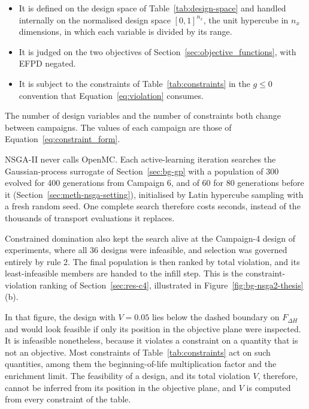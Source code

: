 \begin{itemize}
  \item It is defined on the design space of Table~\ref{tab:design-space}
        and handled internally on the normalised design space
        $[0,1]^{n_x}$, the unit hypercube in $n_x$ dimensions, in which
        each variable is divided by its range.

  \item It is judged on the two objectives of
        Section~\ref{sec:objective_functions}, with EFPD negated.

  \item It is subject to the constraints of Table~\ref{tab:constraints}
        in the $g \le 0$ convention that
        Equation~\eqref{eq:violation} consumes.
\end{itemize}

The number of design variables and the number of constraints both
change between campaigns. The values of each campaign are those of
Equation~\eqref{eq:constraint_form}.

NSGA-II never calls OpenMC. Each active-learning iteration searches
the Gaussian-process surrogate of Section~\ref{sec:bg-gp} with a
population of 300 evolved for 400 generations from Campaign 6, and of
60 for 80 generations before it (Section~\ref{sec:meth-nsga-setting}),
initialised by Latin hypercube sampling with a fresh random seed. One complete search
therefore costs seconds, instead of the thousands of transport
evaluations it replaces.

Constrained domination also kept the search alive at the Campaign-4
design of experiments, where all 36 designs were infeasible, and
selection was governed entirely by rule 2. The final population is then
ranked by total violation, and its least-infeasible members are handed
to the infill step. This is the constraint-violation ranking of
Section~\ref{sec:res-c4}, illustrated in Figure~\ref{fig:bg-nsga2-thesis}(b).

In that figure, the design with $V = 0.05$ lies below the dashed
boundary on $F_{\Delta H}$ and would look feasible if only its position
in the objective plane were inspected. It is infeasible nonetheless,
because it violates a constraint on a quantity that is not an
objective. Most constraints of Table~\ref{tab:constraints} act on such
quantities, among them the beginning-of-life multiplication factor and
the enrichment limit. The feasibility of a design, and its total violation
$V$, therefore, cannot be inferred from its position in the objective
plane, and $V$ is computed from every constraint of the table.

